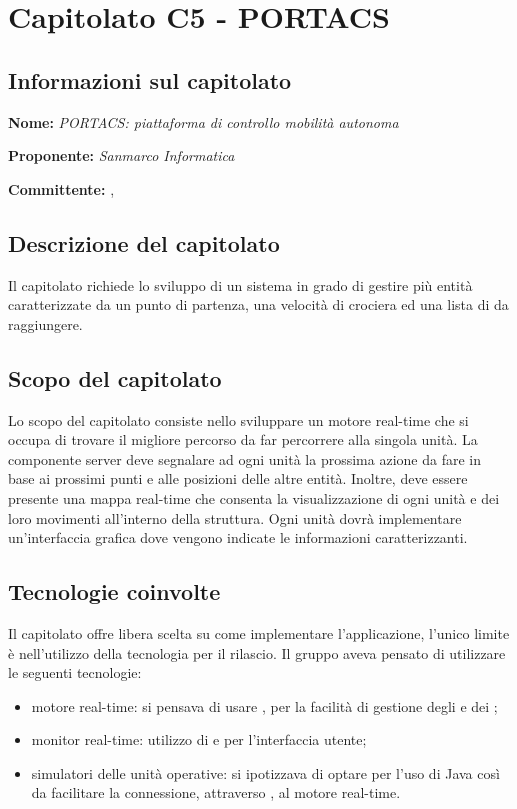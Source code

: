 \section{Capitolato C5 - PORTACS}
\subsection{Informazioni sul capitolato}
\begin{description}
	\item \textbf{Nome:} \textit{PORTACS: piattaforma di controllo mobilità autonoma}
	\item \textbf{Proponente:} \textit{Sanmarco Informatica}
	\item \textbf{Committente:} \VT{}, \CR{}
\end{description}

\subsection{Descrizione del capitolato}
Il capitolato richiede lo sviluppo di un sistema  in grado di gestire più entità caratterizzate da un punto di partenza, una velocità di crociera ed una lista di  da raggiungere.

\subsection{Scopo del capitolato}
Lo scopo del capitolato consiste nello sviluppare un motore real-time che si occupa di trovare il migliore percorso da far percorrere alla singola unità.
La componente server deve segnalare ad ogni unità la prossima azione da fare in base ai prossimi punti e alle posizioni delle altre entità. Inoltre, deve essere presente una mappa real-time che consenta la visualizzazione di ogni unità e dei loro movimenti all'interno della struttura.
Ogni unità dovrà implementare un'interfaccia grafica dove vengono indicate le informazioni caratterizzanti.

\subsection{Tecnologie coinvolte}
Il capitolato offre libera scelta su come implementare l'applicazione, l'unico limite è nell'utilizzo della tecnologia  per il rilascio. Il gruppo aveva pensato di utilizzare le seguenti tecnologie:
\begin{itemize}
	\item motore real-time: si pensava di usare , per la facilità di gestione degli  e dei ;
	\item monitor real-time: utilizzo di  e  per l'interfaccia utente;
	\item simulatori delle unità operative: si ipotizzava di optare per l'uso di Java così da facilitare la connessione, attraverso , al motore real-time.
\end{itemize}

